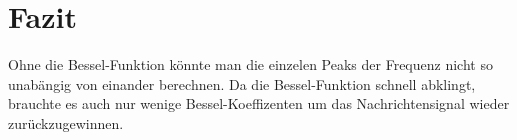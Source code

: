 %
%
%
\section{Fazit
\label{fm:section:fazit}}
Ohne die Bessel-Funktion könnte man die einzelen Peaks der Frequenz
nicht so unabängig von einander berechnen.
Da die Bessel-Funktion schnell abklingt, brauchte es auch nur wenige
Bessel-Koeffizenten um das Nachrichtensignal wieder zurückzugewinnen.


